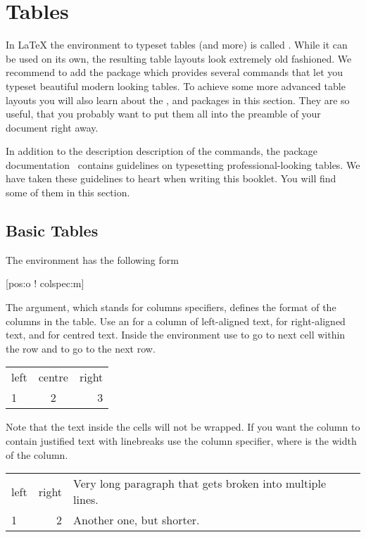 \section{Tables}\label{sec:tables}

In \LaTeX{} the environment to typeset tables (and more) is called
. While it can be used on its own, the resulting table layouts look
extremely old fashioned. We recommend to add the  package which
provides several commands that let you typeset beautiful modern looking tables.
To achieve some more advanced table layouts you will also learn about the
,  and  packages in this section.
They are so useful, that you probably want to put them all into the preamble of
your document right away.

In addition to the description description of the commands, the 
package documentation~\cite{pack:booktabs} contains guidelines on typesetting
professional-looking tables. We have taken these guidelines to heart when
writing this booklet. You will find some of them in this section.

\subsection{Basic Tables}

The environment  has the following form
\begin{lscommand}
  [pos:o ! colspec:m]
\end{lscommand} %
The  argument, which stands for columns specifiers, defines the
format of the columns in the table. Use an  for a column of left-aligned text,
 for right-aligned text, and  for centred text. Inside the
environment use \ai{\&} to go to next cell within the row and
\ci{\textbackslash} to go to the next row.
\begin{example}
\begin{tabular}{lcr}
  left & centre & right \\
  1    & 2      & 3     \\
\end{tabular}
\end{example}
Note that the text inside the cells will not be wrapped. If you want the column
to contain justified text with linebreaks use the 
column specifier, where  is the width of the column.
\begin{example}[examplewidth=0.43\linewidth]
\begin{tabular}{lrp{3cm}}
  left & right & Very long paragraph
                 that gets broken into
                 multiple lines. \\
  1    & 2     & Another one,
                 but shorter. \\
\end{tabular}
\end{example}

